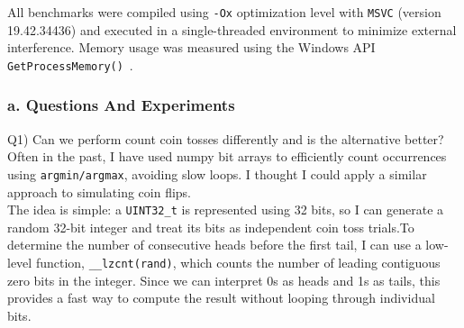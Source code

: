 \documentclass[12pt]{article}
\begin{document}
All benchmarks were compiled using \texttt{-Ox} optimization level with \texttt{MSVC} (version 19.42.34436) and executed in a single-threaded environment to minimize external interference. Memory usage was measured using the Windows API \texttt{GetProcessMemory()}~\cite{getprocessmemoryinfo}.\\

\subsubsection*{a. Questions And Experiments}
	
Q1) Can we perform count coin tosses differently and is the alternative better?\\

Often in the past, I have used numpy bit arrays to efficiently count occurrences using \texttt{argmin/argmax}, avoiding slow loops. I thought I could apply a similar approach to simulating coin flips.\\

The idea is simple: a \texttt{UINT32\_t} is represented using 32 bits, so I can generate a random 32-bit integer and treat its bits as independent coin toss trials.To determine the number of consecutive heads before the first tail, I can use a low-level function, \texttt{\_\_lzcnt(rand)}, which counts the number of leading contiguous zero bits in the integer. Since we can interpret 0s as heads and 1s as tails, this provides a fast way to compute the result without looping through individual bits.
\end{document}
